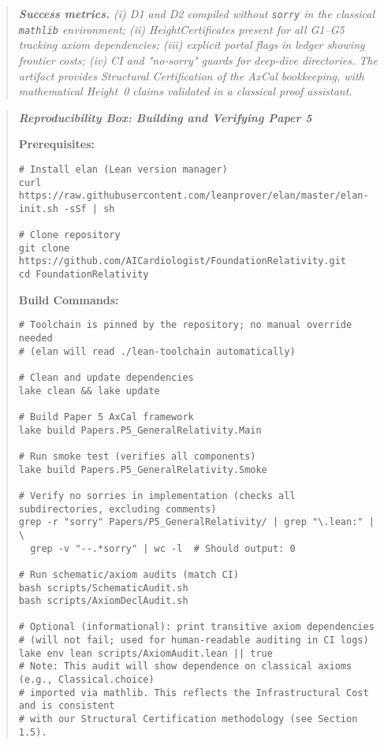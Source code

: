 \documentclass[11pt]{article}
\newenvironment{mdframed}[1][]{\begin{quote}\itshape}{\end{quote}}
\theoremstyle{definition}
\theoremstyle{remark}
\begin{document}
\begin{mdframed}[style=status]
\textbf{Success metrics.} (i) D1 and D2 compiled without \texttt{sorry} in the classical \texttt{mathlib} environment; (ii) HeightCertificates present for all G1--G5 tracking axiom dependencies; (iii) explicit portal flags in ledger showing frontier costs; (iv) CI and "no‑sorry" guards for deep‑dive directories. The artifact provides \emph{Structural Certification} of the AxCal bookkeeping, with mathematical Height~0 claims validated in a classical proof assistant.
\end{mdframed}

\begin{mdframed}[backgroundcolor=blue!5, linecolor=blue!30, linewidth=0.8pt]
\textbf{Reproducibility Box: Building and Verifying Paper 5}

\noindent\textbf{Prerequisites:}
\begin{verbatim}
# Install elan (Lean version manager)
curl https://raw.githubusercontent.com/leanprover/elan/master/elan-init.sh -sSf | sh

# Clone repository
git clone https://github.com/AICardiologist/FoundationRelativity.git
cd FoundationRelativity
\end{verbatim}

\noindent\textbf{Build Commands:}
\begin{verbatim}
# Toolchain is pinned by the repository; no manual override needed
# (elan will read ./lean-toolchain automatically)

# Clean and update dependencies
lake clean && lake update

# Build Paper 5 AxCal framework
lake build Papers.P5_GeneralRelativity.Main

# Run smoke test (verifies all components)
lake build Papers.P5_GeneralRelativity.Smoke

# Verify no sorries in implementation (checks all subdirectories, excluding comments)
grep -r "sorry" Papers/P5_GeneralRelativity/ | grep "\.lean:" | \
  grep -v "--.*sorry" | wc -l  # Should output: 0

# Run schematic/axiom audits (match CI)
bash scripts/SchematicAudit.sh
bash scripts/AxiomDeclAudit.sh

# Optional (informational): print transitive axiom dependencies
# (will not fail; used for human-readable auditing in CI logs)
lake env lean scripts/AxiomAudit.lean || true
# Note: This audit will show dependence on classical axioms (e.g., Classical.choice)
# imported via mathlib. This reflects the Infrastructural Cost and is consistent 
# with our Structural Certification methodology (see Section 1.5).
\end{verbatim}


\end{mdframed}
\end{document}
